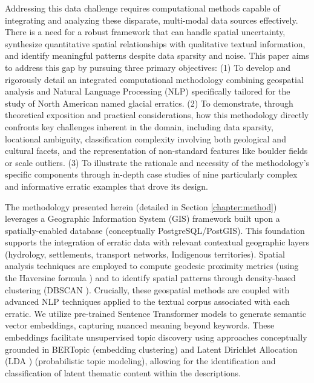 Addressing this data challenge requires computational methods capable of integrating and analyzing these disparate, multi-modal data sources effectively. There is a need for a robust framework that can handle spatial uncertainty, synthesize quantitative spatial relationships with qualitative textual information, and identify meaningful patterns despite data sparsity and noise. This paper aims to address this gap by pursuing three primary objectives: (1) To develop and rigorously detail an integrated computational methodology combining geospatial analysis and Natural Language Processing (NLP) specifically tailored for the study of North American named glacial erratics. (2) To demonstrate, through theoretical exposition and practical considerations, how this methodology directly confronts key challenges inherent in the domain, including data sparsity, locational ambiguity, classification complexity involving both geological and cultural facets, and the representation of non-standard features like boulder fields or scale outliers. (3) To illustrate the rationale and necessity of the methodology's specific components through in-depth case studies of nine particularly complex and informative erratic examples that drove its design.

The methodology presented herein (detailed in Section \ref{chapter:method}) leverages a Geographic Information System (GIS) framework built upon a spatially-enabled database (conceptually PostgreSQL/PostGIS). This foundation supports the integration of erratic data with relevant contextual geographic layers (hydrology, settlements, transport networks, Indigenous territories). Spatial analysis techniques are employed to compute geodesic proximity metrics (using the Haversine formula \cite{Sinnott1984}) and to identify spatial patterns through density-based clustering (DBSCAN \cite{Ester1996}). Crucially, these geospatial methods are coupled with advanced NLP techniques applied to the textual corpus associated with each erratic. We utilize pre-trained Sentence Transformer models \cite{Reimers2019} to generate semantic vector embeddings, capturing nuanced meaning beyond keywords. These embeddings facilitate unsupervised topic discovery using approaches conceptually grounded in BERTopic \cite{Grootendorst2022} (embedding clustering) and Latent Dirichlet Allocation (LDA \cite{Blei2003}) (probabilistic topic modeling), allowing for the identification and classification of latent thematic content within the descriptions.


